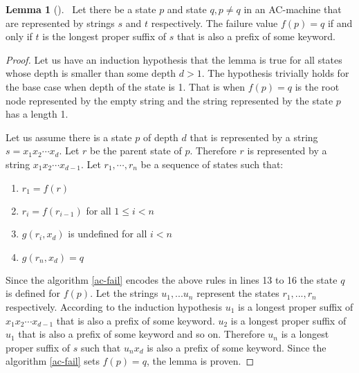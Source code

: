 \documentclass[english,twoside,censored,csm,algorithms-track-2020]{HYthesisML}
\theoremstyle{plain}
\theoremstyle{definition}
\newtheorem{lemma}[theorem]{Lemma}
\begin{document}
\begin{lemma}[]~\label{lem-overlap}
  Let there be a state $p$ and state $q, p\neq q$ in an AC-machine that are represented by strings
  $s$ and $t$ respectively. The failure value $f(p) = q$ if and only if $t$ is the longest proper suffix
  of $s$ that is also a prefix of some keyword.
\end{lemma}
\begin{proof}
  Let us have an induction hypothesis that the lemma is true for all states whose depth is smaller
  than some depth $d > 1$. The hypothesis trivially holds for the base case when
  depth of the state is 1. That is when $f(p) = q$ is the root node represented by the empty
  string and the string represented by the state $p$ has a length 1.
  
  Let us assume there is a state $p$ of depth $d$ that is represented by a string
  $s=x_1x_2\cdots x_d$. Let $r$ be the parent state of $p$. Therefore $r$ is represented by a
  string $x_1x_2\cdots x_{d-1}$. Let $r_1,\cdots ,r_n$ be a sequence of states such that:

  \begin{enumerate}
  \item $r_1 = f(r)$
  \item $r_i = f(r_{i-1})$ for all $ 1 \leq i < n$
  \item $g(r_i, x_d)$ is undefined for all $i < n$
  \item $g(r_n, x_d) = q$
  \end{enumerate}

  Since the algorithm \ref{ac-fail} encodes the above rules in lines 13 to 16 the state $q$ is defined
  for $f(p)$. Let the strings $u_1,...u_n$ represent the states $r_1,...,r_n$ respectively.
  According to the induction hypothesis $u_1$ is a longest proper suffix of $x_1x_2\cdots x_{d-1}$
  that is also a prefix of some keyword. $u_2$ is a longest proper suffix of $u_1$ that is also
  a prefix of some keyword and so on. Therefore $u_n$ is a longest proper suffix of $s$ such that
  $u_nx_d$ is also a prefix of some keyword. Since the algorithm \ref{ac-fail} sets $f(p) = q$,
  the lemma is proven.
  
\end{proof}  
\end{document}
